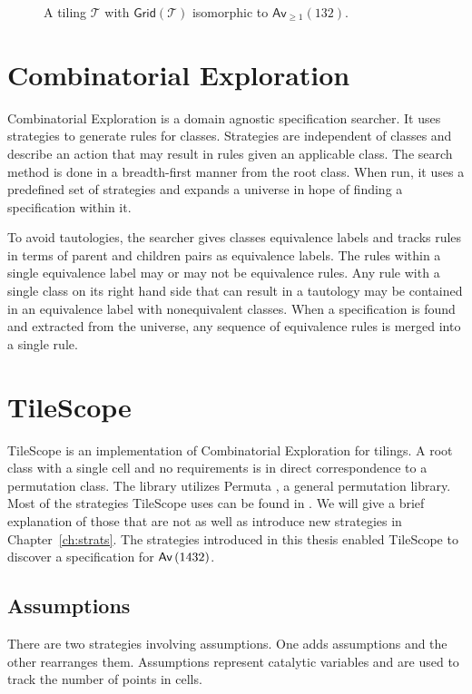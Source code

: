 \begin{figure}[htbp]
    \centering
    
    \caption{A tiling $\mathcal{T}$ with $\textsf{Grid}(\mathcal{T})$ isomorphic to $\textsf{Av}_{\geq1}(132)$.}
    \label{fig:tiling132}
\end{figure}

\section{Combinatorial Exploration}
Combinatorial Exploration \cite{css} is a domain agnostic specification searcher. It uses strategies to generate rules for classes. Strategies are independent of classes and describe an action that may result in rules given an applicable class. The search method is done in a breadth-first manner from the root class. When run, it uses a predefined set of strategies and expands a universe in hope of finding a specification within it.

To avoid tautologies, the searcher gives classes equivalence labels and tracks rules in terms of parent and children pairs as equivalence labels. The rules within a single equivalence label may or may not be equivalence rules. Any rule with a single class on its right hand side that can result in a tautology may be contained in an equivalence label with nonequivalent classes. When a specification is found and extracted from the universe, any sequence of equivalence rules is merged into a single rule.

\section{TileScope}
TileScope \cite{tiling} is an implementation of Combinatorial Exploration for tilings. A root class with a single cell and no requirements is in direct correspondence to a permutation class. The library utilizes Permuta \cite{permuta}, a general permutation library. Most of the strategies TileScope uses can be found in . We will give a brief explanation of those that are not as well as introduce new strategies in Chapter~\ref{ch:strats}. The strategies introduced in this thesis enabled TileScope to discover a specification for $\textsf{Av}\left(1432\right)$.


\subsection{Assumptions}
There are two strategies involving assumptions. One adds assumptions and the other rearranges them. Assumptions represent catalytic variables and are used to track the number of points in cells. 

